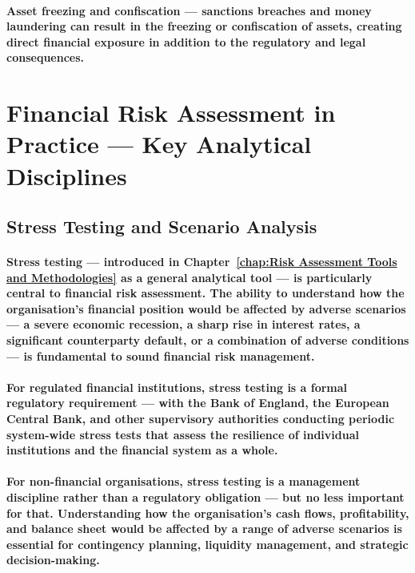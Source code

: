 \paragraph{\textbf{Asset freezing and confiscation} — sanctions breaches and money laundering can result in the freezing or confiscation of assets, creating direct financial exposure in addition to the regulatory and legal consequences.}

\section{Financial Risk Assessment in Practice — Key Analytical Disciplines}

\subsection{Stress Testing and Scenario Analysis}
\paragraph{Stress testing — introduced in Chapter~\ref{chap:Risk Assessment Tools and Methodologies} as a general analytical tool — is particularly central to financial risk assessment. The ability to understand how the organisation's financial position would be affected by adverse scenarios — a severe economic recession, a sharp rise in interest rates, a significant counterparty default, or a combination of adverse conditions — is fundamental to sound financial risk management.}
\paragraph{For regulated financial institutions, stress testing is a formal regulatory requirement — with the Bank of England, the European Central Bank, and other supervisory authorities conducting periodic system-wide stress tests that assess the resilience of individual institutions and the financial system as a whole.}
\paragraph{For non-financial organisations, stress testing is a management discipline rather than a regulatory obligation — but no less important for that. Understanding how the organisation's cash flows, profitability, and balance sheet would be affected by a range of adverse scenarios is essential for contingency planning, liquidity management, and strategic decision-making.}
